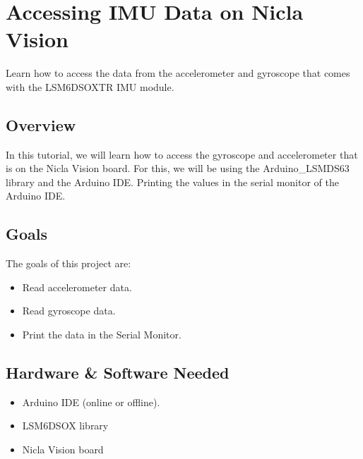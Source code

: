 



\section{Accessing IMU Data on Nicla Vision}

Learn how to access the data from the accelerometer and gyroscope that comes with the LSM6DSOXTR IMU module.


\subsection{Overview}


In this tutorial, we will learn how to access the gyroscope and accelerometer that is on the Nicla Vision board. For this, we will be using the Arduino\_LSMDS63 library and the Arduino IDE. Printing the values in the serial monitor of the Arduino IDE.

\subsection{Goals}
The goals of this project are:

\begin{itemize}
  \item Read accelerometer data.
  \item Read gyroscope data.
  \item Print the data in the Serial Monitor.
\end{itemize}


\subsection{Hardware \& Software Needed}

\begin{itemize}
  \item Arduino IDE (online or offline).
  \item LSM6DSOX library
  \item Nicla Vision board
\end{itemize}
